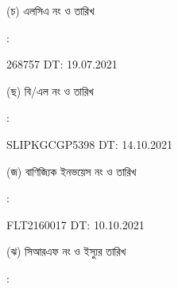 \documentclass[12pt]{article}
\newcommand{\lcdt}{19.07.2021}
\newcommand{\lcano}{268757}
\newcommand{\lcadt}{{\lcdt}}
\newcommand{\invno}{FLT2160017}
\newcommand{\invdt}{10.10.2021}
\newcommand{\blno}{SLIPKGCGP5398}
\newcommand{\bldt}{14.10.2021}
\begin{document}
\begin{minipage}[t]{0.05\linewidth}
\hspace*{1em}
\end{minipage}
\begin{minipage}[t]{0.45\linewidth}
(চ) এলসিএ নং ও তারিখ
\end{minipage}
\begin{minipage}[t]{0.02\linewidth}
:
\end{minipage}
\begin{minipage}[t]{0.50\linewidth}
{\lcano} \hspace{2em} DT: {\lcadt}
\\
\end{minipage}
\begin{minipage}[t]{0.05\linewidth}
\hspace*{1em}
\end{minipage}
\begin{minipage}[t]{0.45\linewidth}
(ছ) বি/এল নং ও তারিখ
\end{minipage}
\begin{minipage}[t]{0.02\linewidth}
:
\end{minipage}
\begin{minipage}[t]{0.50\linewidth}
{\blno} \hspace{2em} DT: {\bldt}
\\
\end{minipage}
\begin{minipage}[t]{0.05\linewidth}
\hspace*{1em}
\end{minipage}
\begin{minipage}[t]{0.45\linewidth}
(জ) বাণিজ্যিক ইনভয়েস নং ও তারিখ
\end{minipage}
\begin{minipage}[t]{0.02\linewidth}
:
\end{minipage}
\begin{minipage}[t]{0.50\linewidth}
{\invno} \hspace{2em} DT: {\invdt}
\\
\end{minipage}
\begin{minipage}[t]{0.05\linewidth}
\hspace*{1em}
\end{minipage}
\begin{minipage}[t]{0.45\linewidth}
(ঝ) সিআরএফ নং ও ইস্যুর তারিখ
\end{minipage}
\begin{minipage}[t]{0.02\linewidth}
:
\end{minipage}
\end{document}
